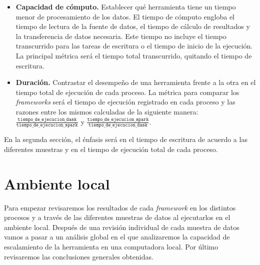 \begin{itemize}
	\item \textbf{Capacidad de cómputo.} Establecer qué herramienta tiene un tiempo menor de procesamiento de los datos. El tiempo de cómputo engloba el tiempo de lectura de la fuente de datos, el tiempo de cálculo de resultados y la transferencia de datos necesaria. Este tiempo no incluye el tiempo transcurrido para las tareas de escritura o el tiempo de inicio de la ejecución. La principal métrica será el tiempo total transcurrido, quitando el tiempo de escritura.
	
	\item \textbf{Duración.} Contrastar el desempeño de una herramienta frente a la otra en el tiempo total de ejecución de cada proceso. La métrica para comparar los \textit{frameworks} será el tiempo de ejecución registrado en cada proceso y las razones entre los mismos calculadas de la siguiente manera: $\frac{\texttt{tiempo\_de\_ejecucion\_dask}}{\texttt{tiempo\_de\_ejecucion\_spark}}$ y $\frac{\texttt{tiempo\_de\_ejecucion\_spark}}{\texttt{tiempo\_de\_ejecucion\_dask}}$.
\end{itemize}

En la segunda sección, el énfasis será en el tiempo de escritura de acuerdo a las diferentes muestras y en el tiempo de ejecución total de cada proceso.

\section{Ambiente local}
\label{section:resultados-ambiente-local}

Para empezar revisaremos los resultados de cada \textit{framework} en los distintos procesos y a través de las diferentes muestras de datos al ejecutarlos en el ambiente local. Después de una revisión individual de cada muestra de datos vamos a pasar a un análisis global en el que analizaremos la capacidad de escalamiento de la herramienta en una computadora local. Por último revisaremos las conclusiones generales obtenidas.

